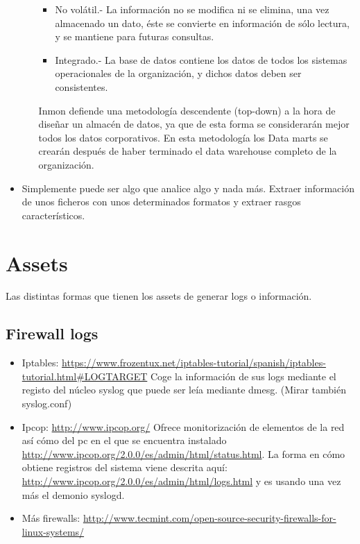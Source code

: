 \documentclass[a4paper,12pt]{article}
\begin{document}
\begin{itemize}
\begin{itemize}
\begin{itemize}
    \item No volátil.- La información no se modifica ni se elimina, una vez almacenado un dato, éste se convierte en información de sólo lectura, y se mantiene para futuras consultas.
    \item Integrado.- La base de datos contiene los datos de todos los sistemas operacionales de la organización, y dichos datos deben ser consistentes.
    \end{itemize}
Inmon defiende una metodología descendente (top-down) a la hora de diseñar un almacén de datos, ya que de esta forma se considerarán mejor todos los datos corporativos. En esta metodología los Data marts se crearán después de haber terminado el data warehouse completo de la organización.
  \end{itemize}
\item Simplemente puede ser algo que analice algo y nada más. Extraer información de unos ficheros con unos determinados formatos y extraer rasgos característicos.
\end{itemize}

\section{Assets}

Las distintas formas que tienen los assets de generar logs o información.

\subsection{Firewall logs}

\begin{itemize}
\item Iptables: \url{https://www.frozentux.net/iptables-tutorial/spanish/iptables-tutorial.html\#LOGTARGET} Coge la información de sus logs mediante el registo del núcleo syslog que puede ser leía mediante dmesg. (Mirar también syslog.conf)
\item Ipcop: \url{http://www.ipcop.org/} Ofrece monitorización de elementos de la red así cómo del pc en el que se encuentra instalado \url{http://www.ipcop.org/2.0.0/es/admin/html/status.html}. La forma en cómo obtiene registros del sistema viene descrita aquí: \url{http://www.ipcop.org/2.0.0/es/admin/html/logs.html} y es usando una vez más el demonio syslogd.
\item Más firewalls:  \url{http://www.tecmint.com/open-source-security-firewalls-for-linux-systems/}
\end{itemize}
\end{document}
